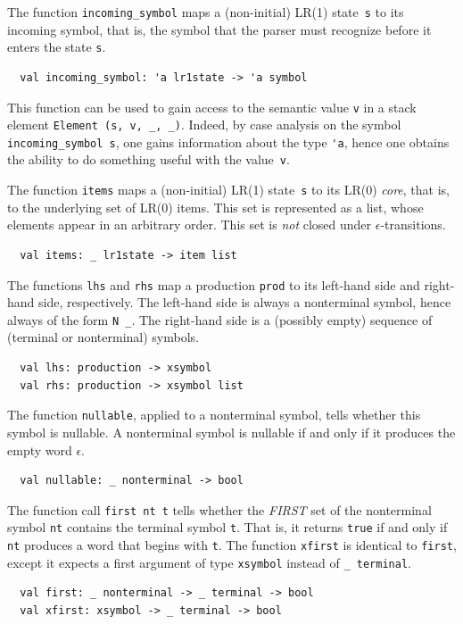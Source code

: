 \documentclass[onecolumn,11pt,nocopyrightspace,preprint]{sigplanconf}
\begin{document}

The function \verb+incoming_symbol+ maps a (non-initial) LR(1)
state~\verb+s+ to its incoming symbol, that is, the symbol that the parser
must recognize before it enters the state \verb+s+.
%
\begin{verbatim}
  val incoming_symbol: 'a lr1state -> 'a symbol
\end{verbatim}
%
This function can be used to gain access to the semantic value \verb+v+
in a stack element \verb+Element (s, v, _, _)+. Indeed, by case analysis on the
symbol \verb+incoming_symbol s+, one gains information about the type \verb+'a+,
hence one obtains the ability to do something useful with the value~\verb+v+.


The function \verb+items+ maps a (non-initial) LR(1) state~\verb+s+ to its
LR(0) \emph{core}, that is, to the underlying set of LR(0) items. This set
is represented as a list, whose elements appear in an arbitrary order. This
set is \emph{not} closed under $\epsilon$-transitions.
%
\begin{verbatim}
  val items: _ lr1state -> item list
\end{verbatim}


The functions \verb+lhs+ and \verb+rhs+ map a production \verb+prod+ to
its left-hand side and right-hand side, respectively. The left-hand side
is always a nonterminal symbol, hence always of the form \verb+N _+. The
right-hand side is a (possibly empty) sequence of (terminal or nonterminal)
symbols.
%
\begin{verbatim}
  val lhs: production -> xsymbol
  val rhs: production -> xsymbol list
\end{verbatim}
%


The function \verb+nullable+, applied to a nonterminal symbol,
tells whether this symbol is nullable. A nonterminal symbol is nullable if and
only if it produces the empty word $\epsilon$.
%
\begin{verbatim}
  val nullable: _ nonterminal -> bool
\end{verbatim}


The function call \verb+first nt t+ tells whether the \emph{FIRST} set of the
nonterminal symbol \verb+nt+ contains the terminal symbol \verb+t+. That is,
it returns \verb+true+ if and only if \verb+nt+ produces a word that begins
with \verb+t+. The function \verb+xfirst+ is identical to \verb+first+, except
it expects a first argument of type \verb+xsymbol+ instead of \verb+_ terminal+.
%
\begin{verbatim}
  val first: _ nonterminal -> _ terminal -> bool
  val xfirst: xsymbol -> _ terminal -> bool
\end{verbatim}
\end{document}
